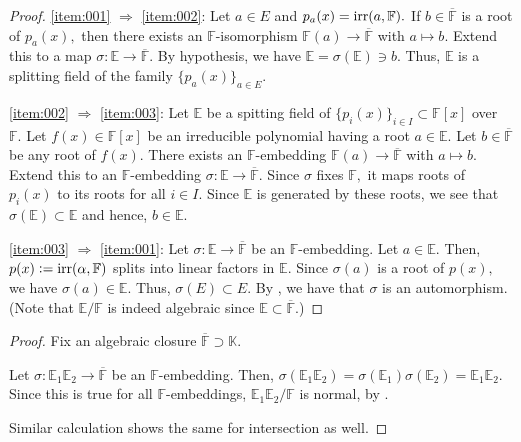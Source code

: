 \normalequivalent*\label{thm:normalequivalent2}
\begin{flushright}\hyperref[thm:normalequivalent]{\upsym}\end{flushright}
\begin{proof}
    \ref{item:001} $\Rightarrow$ \ref{item:002}: Let $a \in E$ and $p_a(x) = \operatorname{irr}(a, \mathbb{F}).$ If $b \in \overline{\mathbb{F}}$ is a root of $p_a(x),$ then there exists an $\mathbb{F}$-isomorphism $\mathbb{F}(a) \to \overline{\mathbb{F}}$ with $a \mapsto b.$ Extend this to a map $\sigma : \mathbb{E} \to \overline{\mathbb{F}}.$ By hypothesis, we have $\mathbb{E} = \sigma(\mathbb{E}) \ni b.$ Thus, $\mathbb{E}$ is a splitting field of the family $\{p_a(x)\}_{a \in E}.$

    \ref{item:002} $\Rightarrow$ \ref{item:003}: Let $\mathbb{E}$ be a spitting field of $\{p_i(x)\}_{i \in I} \subset \mathbb{F}[x]$ over $\mathbb{F}.$ Let $f(x) \in \mathbb{F}[x]$ be an irreducible polynomial having a root $a \in \mathbb{E}.$ Let $b \in \overline{\mathbb{F}}$ be any root of $f(x).$ There exists an $\mathbb{F}$-embedding $\mathbb{F}(a) \to \overline{\mathbb{F}}$ with $a \mapsto b.$ Extend this to an $\mathbb{F}$-embedding $\sigma : \mathbb{E} \to \overline{\mathbb{F}}.$ Since $\sigma$ fixes $\mathbb{F},$ it maps roots of $p_i(x)$ to its roots for all $i \in I.$ Since $\mathbb{E}$ is generated by these roots, we see that $\sigma(\mathbb{E}) \subset \mathbb{E}$ and hence, $b \in \mathbb{E}.$

    \ref{item:003} $\Rightarrow$ \ref{item:001}: Let $\sigma : \mathbb{E} \to \overline{\mathbb{F}}$ be an $\mathbb{F}$-embedding. Let $a \in \mathbb{E}.$ Then, $p(x) \vcentcolon= \operatorname{irr}(\alpha, \mathbb{F})$ splits into linear factors in $\mathbb{E}.$ Since $\sigma(a)$ is a root of $p(x),$ we have $\sigma(a) \in \mathbb{E}.$ Thus, $\sigma(E) \subset E.$ By , we have that $\sigma$ is an automorphism. (Note that $\mathbb{E}/\mathbb{F}$ is indeed algebraic since $\mathbb{E} \subset \overline{\mathbb{F}}.$)
\end{proof}

\operationsonnormalexts*\label{prop:operationsonnormalexts2}
\begin{flushright}\hyperref[prop:operationsonnormalexts]{\upsym}\end{flushright}
\begin{proof}
    Fix an algebraic closure $\overline{\mathbb{F}} \supset \mathbb{K}.$

    Let $\sigma : \mathbb{E}_1\mathbb{E}_2 \to \overline{\mathbb{F}}$ be an $\mathbb{F}$-embedding. Then, $\sigma(\mathbb{E}_1\mathbb{E}_2) = \sigma(\mathbb{E}_1)\sigma(\mathbb{E}_2) = \mathbb{E}_1\mathbb{E}_2.$ Since this is true for all $\mathbb{F}$-embeddings, $\mathbb{E}_1\mathbb{E}_2/\mathbb{F}$ is normal, by .

    Similar calculation shows the same for intersection as well.
\end{proof}

